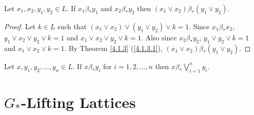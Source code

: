 \documentclass[handout]{beamer}
\begin{document}
\begin{frame}
\begin{theorem}\label{4.1.20}
  Let $ x_1,x_2,y_1,y_2 \in L $. If $ x_1 \beta_* y_1 $ and $ x_2 \beta_* y_2 $ then $ ( x_1 \vee x_2 ) \beta_* ( y_1 \vee y_2 ) $.
\end{theorem}
\begingroup
{}
\begin{proof}
  Let $ k \in L $ such that $ (x_1 \vee x_2 ) \vee (y_1 \vee y_2 ) \vee k = 1 $. Since $ x_1 \beta_* x_2 $, 
  $ y_1 \vee x_2 \vee y_2 \vee k = 1 $ and $ x_1 \vee x_2 \vee y_2 \vee k = 1 $. Also since 
  $ x_2 \beta_* y_2 $, $ y_1 \vee y_2 \vee k = 1 $ and $ x_1 \vee x_2 \vee k = 1 $. 
  By Theorem \ref{4.1.3} (\ref{4.1.3.1}), $ ( x_1 \vee x_2 ) \beta_* ( y_1 \vee y_2 ) $.
\end{proof}
\endgroup
\begin{corollary}\label{4.1.21}
  Let $ x, y_1, y_2,...,y_n \in L $. If $ x \beta_* y_i $ for $ i=1,2,...,n $ then $ \displaystyle x \beta_* \bigvee_{i=1}^n y_i $.
\end{corollary}
\end{frame}


\section{$ G_* $-Lifting Lattices}
\subsection*{}
\end{document}
